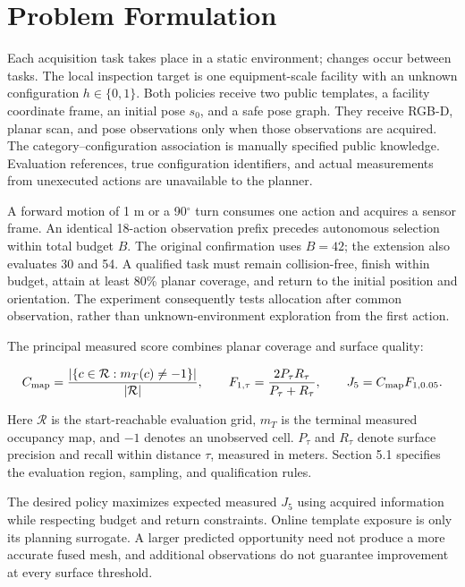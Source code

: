 \documentclass[11pt,a4paper]{article}
\providecommand{\hypertarget}[2]{#2}
\begin{document}
\hypertarget{problem-formulation}{%
\section{Problem Formulation}\label{problem-formulation}}

Each acquisition task takes place in a static environment; changes occur between tasks. The local inspection target is one equipment-scale facility with an unknown configuration \(h\in\{0,1\}\). Both policies receive two public templates, a facility coordinate frame, an initial pose \(s_0\), and a safe pose graph. They receive RGB-D, planar scan, and pose observations only when those observations are acquired. The category--configuration association is manually specified public knowledge. Evaluation references, true configuration identifiers, and actual measurements from unexecuted actions are unavailable to the planner.

A forward motion of 1 m or a 90\ensuremath{^{\circ}} turn consumes one action and acquires a sensor frame. An identical 18-action observation prefix precedes autonomous selection within total budget \(B\). The original confirmation uses \(B=42\); the extension also evaluates 30 and 54. A qualified task must remain collision-free, finish within budget, attain at least 80\% planar coverage, and return to the initial position and orientation. The experiment consequently tests allocation after common observation, rather than unknown-environment exploration from the first action.

The principal measured score combines planar coverage and surface quality:

\[
C_{\rm map}=\frac{|\{c\in\mathcal R:m_T(c)\ne-1\}|}{|\mathcal R|},
\qquad F_{1,\tau}=\frac{2P_\tau R_\tau}{P_\tau+R_\tau},
\qquad J_5=C_{\rm map}F_{1,0.05}.
\]

Here \(\mathcal R\) is the start-reachable evaluation grid, \(m_T\) is the terminal measured occupancy map, and \(-1\) denotes an unobserved cell. \(P_\tau\) and \(R_\tau\) denote surface precision and recall within distance \(\tau\), measured in meters. Section 5.1 specifies the evaluation region, sampling, and qualification rules.

The desired policy maximizes expected measured \(J_5\) using acquired information while respecting budget and return constraints. Online template exposure is only its planning surrogate. A larger predicted opportunity need not produce a more accurate fused mesh, and additional observations do not guarantee improvement at every surface threshold.
\end{document}
